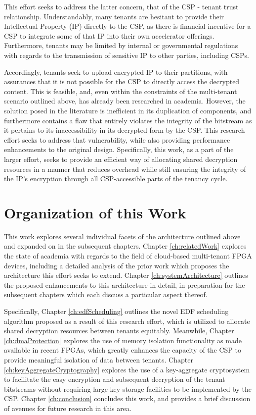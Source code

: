 This effort seeks to address the latter concern, that of the CSP - tenant trust relationship. Understandably, many tenants are hesitant to provide their Intellectual Property (IP) directly to the CSP, as there is financial incentive for a CSP to integrate some of that IP into their own accelerator offerings. Furthermore, tenants may be limited by internal or governmental regulations with regards to the transmission of sensitive IP to other parties, including CSPs. 

Accordingly, tenants seek to upload encrypted IP to their partitions, with assurances that it is not possible for the CSP to directly access the decrypted content. This is feasible, and, even within the constraints of the multi-tenant scenario outlined above, has already been researched in academia. However, the solution posed in the literature is inefficient in its duplication of components, and furthermore contains a flaw that entirely violates the integrity of the bitstream as it pertains to its inaccessibility in its decrypted form by the CSP. This research effort seeks to address that vulnerability, while also providing performance enhancements to the original design. Specifically, this work, as a part of the larger effort, seeks to provide an efficient way of allocating shared decryption resources in a manner that reduces overhead while still ensuring the integrity of the IP's encryption through all CSP-accessible parts of the tenancy cycle.

\section{Organization of this Work}\label{sec:organization}
This work explores several individual facets of the architecture outlined above and expanded on in the subsequent chapters. Chapter \ref{ch:relatedWork} explores the state of academia with regards to the field of cloud-based multi-tenant FPGA devices, including a detailed analysis of the prior work which proposes the architecture this effort seeks to extend. Chapter \ref{ch:systemArchitecture} outlines the proposed enhancements to this architecture in detail, in preparation for the subsequent chapters which each discuss a particular aspect thereof.

Specifically, Chapter \ref{ch:edfScheduling} outlines the novel EDF scheduling algorithm proposed as a result of this research effort, which is utilized to allocate shared decryption resources between tenants equitably. Meanwhile, Chapter \ref{ch:dmaProtection} explores the use of memory isolation functionality as made available in recent FPGAs, which greatly enhances the capacity of the CSP to provide meaningful isolation of data between tenants. Chapter \ref{ch:keyAggregateCryptography} explores the use of a key-aggregate cryptosystem to facilitate the easy encryption and subsequent decryption of the tenant bitstreams without requiring large key storage facilities to be implemented by the CSP. Chapter \ref{ch:conclusion} concludes this work, and provides a brief discussion of avenues for future research in this area.